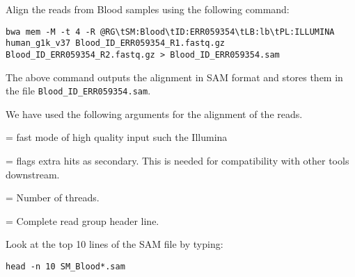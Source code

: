 \begin{steps}
Align the reads from Blood samples using the following command: 

\begin{lstlisting}
bwa mem -M -t 4 -R @RG\tSM:Blood\tID:ERR059354\tLB:lb\tPL:ILLUMINA human_g1k_v37 Blood_ID_ERR059354_R1.fastq.gz Blood_ID_ERR059354_R2.fastq.gz > Blood_ID_ERR059354.sam
\end{lstlisting}

The above command outputs the alignment in SAM format and stores them in the
file \texttt{Blood_ID_ERR059354.sam}.
\end{steps}

\begin{note}
We have used the following arguments for the alignment of the reads.
\begin{description}[style=multiline,labelindent=0cm,align=right,leftmargin=\descriptionlabelspace,rightmargin=1.5cm,font=\ttfamily]
  \item[mem] = fast mode of high quality input such the Illumina
  \item[-M] = flags extra hits as secondary. This is needed for compatibility with other tools downstream.
  \item[-t] = Number of threads.
  \item[-R] = Complete read group header line.
\end{description}

\end{note}

\begin{steps}
Look at the top 10 lines of the SAM file by typing:

\begin{lstlisting}
head -n 10 SM_Blood*.sam
\end{lstlisting}
\end{steps}

